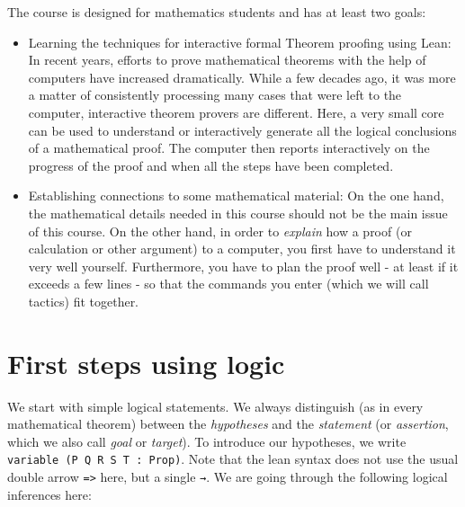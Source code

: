\documentclass{memoir}
\begin{document}
The course is designed for mathematics students and has at least two goals:

\begin{itemize}
\item Learning the techniques for interactive formal Theorem proofing using Lean: In recent years, efforts to prove mathematical theorems with the help of computers have increased dramatically. While a few decades ago, it was more a matter of consistently processing many cases that were left to the computer, interactive theorem provers are different. Here, a very small core can be used to understand or interactively generate all the logical conclusions of a mathematical proof. The computer then reports interactively on the progress of the proof and when all the steps have been completed.\item Establishing connections to some mathematical material: On the one hand, the mathematical details needed in this course should not be the main issue of this course. On the other hand, in order to \emph{explain} how a proof (or calculation or other argument) to a computer, you first have to understand it very well yourself. Furthermore, you have to plan the proof well - at least if it exceeds a few lines - so that the commands you enter (which we will call tactics) fit together.
\end{itemize}





\chapter{First steps using logic}

We start with simple logical statements. We always distinguish (as in every mathematical theorem) between the \emph{hypotheses} and the \emph{statement} (or \emph{assertion}, which we also call \emph{goal} or \emph{target}). To introduce our hypotheses, we write \Verb|variable (P Q R S T : Prop)|. Note that the lean syntax does not use the usual double arrow \Verb|=>| here, but a single \Verb|→|. We are going through the following logical inferences here:
\end{document}
